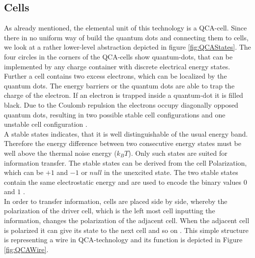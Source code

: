 \subsection{Cells}
As already mentioned, the elemental unit of this technology is a QCA-cell. Since there in no uniform way of build the quantum dots and connecting them to cells, we look at a rather lower-level abstraction depicted in figure \ref{fig:QCAStates}. The four circles in the corners of the QCA-cells show quantum-dots, that can be implemented by any charge container with discrete electrical energy states. Further a cell contains two excess electrons, which can be localized by the quantum dots. The energy barriers or the quantum dots are able to trap the charge of the electron. If an electron is trapped inside a quantum-dot it is filled black. Due to the Coulomb repulsion the electrons occupy diagonally opposed quantum dots, resulting in two possible stable cell configurations and one unstable cell configuration \cite{Sasamal2020QuantumDotCA, lent1997device, lent1994quantum}.\\
A stable states indicates, that it is well distinguishable of the usual energy band. Therefore the energy difference between two consecutive energy states must be well above the thermal noise energy ($k_BT$). Only such states are suited for information transfer. The stable states can be derived from the cell Polarization, which can be $+1$ and $-1$ or $null$ in the unexcited state. The two stable states contain the same electrostatic energy and are used to encode the binary values $0$ and $1$ \cite{Sasamal2020QuantumDotCA}.\\
In order to transfer information, cells are placed side by side, whereby the polarization of the driver cell, which is the left most cell inputting the information, changes the polarization of the adjacent cell. When the adjacent cell is polarized it can give its state to the next cell and so on \cite{lent1997device}. This simple structure is representing a wire in QCA-technology and its function is depicted in Figure \ref{fig:QCAWire}.

